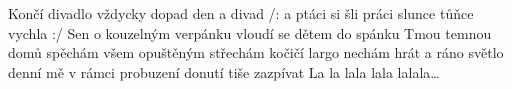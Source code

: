 \begin{TEXT}{Končí divadlo}
\SLOKA {} vždycky  dopad \NL
{} den a  divad \NL
/:  a  ptáci \NL
{} si šli  práci \NL
{}slunce tůňce vychla :/ 
\SLOKA Sen o kouzelným verpánku \NL
vloudí se dětem do spánku \NL
Tmou temnou domů spěchám \NL
všem opuštěným střechám \NL
kočičí largo nechám hrát \NL
a ráno světlo denní \NL
mě v rámci probuzení \NL
donutí tiše zazpívat 
\SLOKA La la lala lala lalala… \NL
\end{TEXT}
